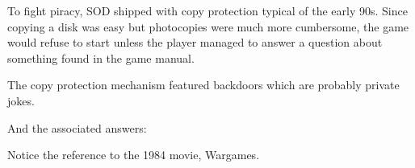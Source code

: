 \documentclass[book.tex]{subfiles}
\begin{document}
   \par
\begin{figure}[H]
\centering
 \end{figure}
 \par

To fight piracy, SOD shipped with copy protection typical of the early 90s. Since copying a disk was easy but photocopies were much more cumbersome, the game would refuse to start unless the player managed to answer a question about something found in the game manual.\\
    \par
\begin{figure}[H]
\centering
 \end{figure}
 \par
 The copy protection mechanism featured backdoors which are probably private jokes.
\par
\begin{minipage}{\textwidth}

\end{minipage}
\par
And the associated answers:\\
\par
\begin{minipage}{\textwidth}

\end{minipage}
\par
Notice the reference to the 1984 movie, Wargames.
    \par
\begin{figure}[H]
\centering
 \end{figure}
 \par
\end{document}

